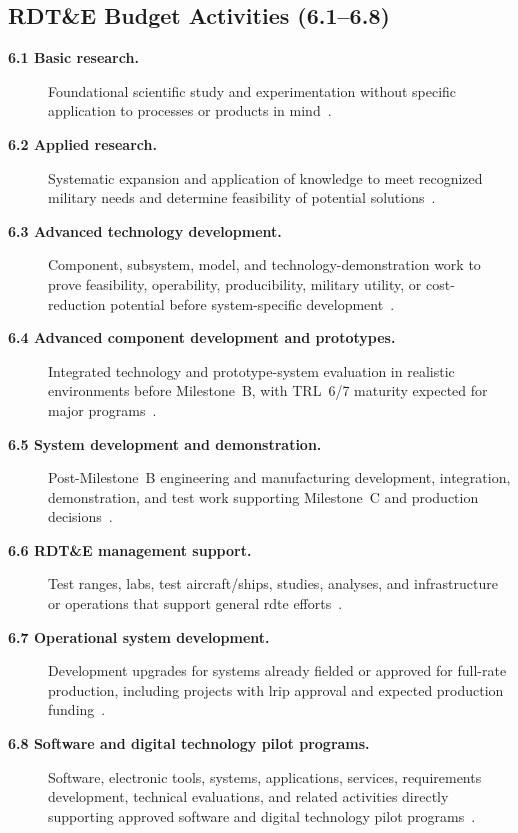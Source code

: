 \documentclass[../main.tex]{subfiles}
\begin{document}
\subsection{RDT\&E Budget Activities (6.1--6.8)}
\begin{description}
  \item[\textbf{6.1 Basic research.}] Foundational scientific study and experimentation without specific application to processes or products in mind~\autocite{edo-3-3-4-research-development-2025,DoDFMR-Vol2B-Ch5}.
  \item[\textbf{6.2 Applied research.}] Systematic expansion and application of knowledge to meet recognized military needs and determine feasibility of potential solutions~\autocite{edo-3-3-4-research-development-2025,DoDFMR-Vol2B-Ch5}.
  \item[\textbf{6.3 Advanced technology development.}] Component, subsystem, model, and technology-demonstration work to prove feasibility, operability, producibility, military utility, or cost-reduction potential before system-specific development~\autocite{edo-3-3-4-research-development-2025,DoDFMR-Vol2B-Ch5}.
  \item[\textbf{6.4 Advanced component development and prototypes.}] Integrated technology and prototype-system evaluation in realistic environments before Milestone~B, with TRL~6/7 maturity expected for major programs~\autocite{edo-3-3-4-research-development-2025,DoDFMR-Vol2B-Ch5}.
  \item[\textbf{6.5 System development and demonstration.}] Post-Milestone~B engineering and manufacturing development, integration, demonstration, and test work supporting Milestone~C and production decisions~\autocite{edo-3-3-4-research-development-2025,DoDFMR-Vol2B-Ch5}.
  \item[\textbf{6.6 RDT\&E management support.}] Test ranges, labs, test aircraft/ships, studies, analyses, and infrastructure or operations that support general \ac{rdte} efforts~\autocite{edo-3-3-4-research-development-2025,DoDFMR-Vol2B-Ch5}.
  \item[\textbf{6.7 Operational system development.}] Development upgrades for systems already fielded or approved for full-rate production, including projects with \ac{lrip} approval and expected production funding~\autocite{edo-3-3-4-research-development-2025,DoDFMR-Vol2B-Ch5}.
  \item[\textbf{6.8 Software and digital technology pilot programs.}] Software, electronic tools, systems, applications, services, requirements development, technical evaluations, and related activities directly supporting approved software and digital technology pilot programs~\autocite{DoDFMR-Vol2B-Ch5}.
\end{description}
\end{document}
